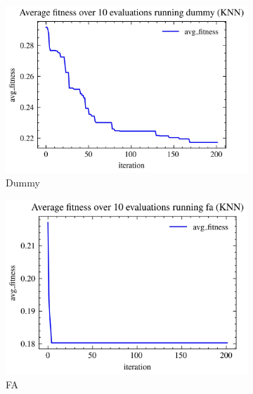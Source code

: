 \begin{figure}[H]
    \begin{subfigure}[b]{0.3\textwidth}
        \centering
        \includegraphics[width=\textwidth]{imagenes/binary_knn_fitness/KNN_fitness_over_10_evaluations_dummy_binary_breast-cancer.jpg}
        \caption{Dummy}
        \label{fig:sub7}
    \end{subfigure}
    \hfill
    \begin{subfigure}[b]{0.3\textwidth}
        \centering
        \includegraphics[width=\textwidth]{imagenes/binary_knn_fitness/KNN_fitness_over_10_evaluations_fa_binary_breast-cancer.jpg}
        \caption{FA}
        \label{fig:sub8}
    \end{subfigure}
    \hfill
    \begin{subfigure}[b]{0.3\textwidth}
        \centering

\end{subfigure}
\end{figure}
